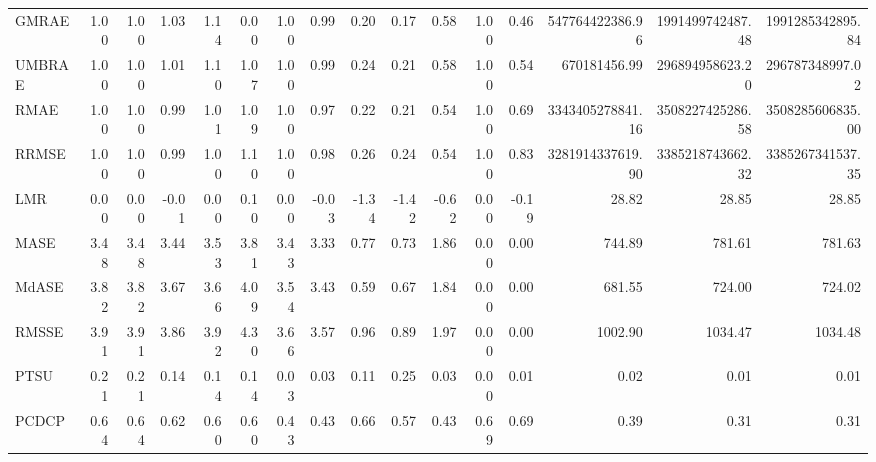 \begin{tabular}{l|rrrrr|rrrrr|rrrrr}
GMRAE & 1.00 & 1.00 & 1.03 & 1.14 & 0.00 & 1.00 & 0.99 & 0.20 & 0.17 & 0.58 & 1.00 & 0.46 & 547764422386.96 & 1991499742487.48 & 1991285342895.84 \\
UMBRAE & 1.00 & 1.00 & 1.01 & 1.10 & 1.07 & 1.00 & 0.99 & 0.24 & 0.21 & 0.58 & 1.00 & 0.54 & 670181456.99 & 296894958623.20 & 296787348997.02 \\
RMAE & 1.00 & 1.00 & 0.99 & 1.01 & 1.09 & 1.00 & 0.97 & 0.22 & 0.21 & 0.54 & 1.00 & 0.69 & 3343405278841.16 & 3508227425286.58 & 3508285606835.00 \\
RRMSE & 1.00 & 1.00 & 0.99 & 1.00 & 1.10 & 1.00 & 0.98 & 0.26 & 0.24 & 0.54 & 1.00 & 0.83 & 3281914337619.90 & 3385218743662.32 & 3385267341537.35 \\
LMR & 0.00 & 0.00 & -0.01 & 0.00 & 0.10 & 0.00 & -0.03 & -1.34 & -1.42 & -0.62 & 0.00 & -0.19 & 28.82 & 28.85 & 28.85 \\
MASE & 3.48 & 3.48 & 3.44 & 3.53 & 3.81 & 3.43 & 3.33 & 0.77 & 0.73 & 1.86 & 0.00 & 0.00 & 744.89 & 781.61 & 781.63 \\
MdASE & 3.82 & 3.82 & 3.67 & 3.66 & 4.09 & 3.54 & 3.43 & 0.59 & 0.67 & 1.84 & 0.00 & 0.00 & 681.55 & 724.00 & 724.02 \\
RMSSE & 3.91 & 3.91 & 3.86 & 3.92 & 4.30 & 3.66 & 3.57 & 0.96 & 0.89 & 1.97 & 0.00 & 0.00 & 1002.90 & 1034.47 & 1034.48 \\
PTSU & 0.21 & 0.21 & 0.14 & 0.14 & 0.14 & 0.03 & 0.03 & 0.11 & 0.25 & 0.03 & 0.00 & 0.01 & 0.02 & 0.01 & 0.01 \\
PCDCP & 0.64 & 0.64 & 0.62 & 0.60 & 0.60 & 0.43 & 0.43 & 0.66 & 0.57 & 0.43 & 0.69 & 0.69 & 0.39 & 0.31 & 0.31 \\
\bottomrule
\end{tabular}
